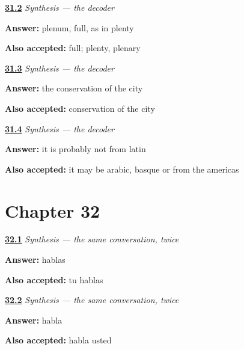 \noindent\begin{minipage}[t]{\linewidth}
\raggedright
\hyperlink{review-ES-C57-sintesis-descifrar-ll}{\textbf{31.2}} \emph{Synthesis — the decoder}\par
\small \textbf{Answer:} plenum, full, as in plenty\par
\footnotesize \textbf{Also accepted:} full; plenty, plenary
\end{minipage}\par\medskip

\noindent\begin{minipage}[t]{\linewidth}
\raggedright
\hyperlink{review-ES-C57-sintesis-descifrar-mix}{\textbf{31.3}} \emph{Synthesis — the decoder}\par
\small \textbf{Answer:} the conservation of the city\par
\footnotesize \textbf{Also accepted:} conservation of the city
\end{minipage}\par\medskip

\noindent\begin{minipage}[t]{\linewidth}
\raggedright
\hyperlink{review-ES-C57-sintesis-descifrar-limits}{\textbf{31.4}} \emph{Synthesis — the decoder}\par
\small \textbf{Answer:} it is probably not from latin\par
\footnotesize \textbf{Also accepted:} it may be arabic, basque or from the americas
\end{minipage}\par\medskip

\section*{Chapter 32}

\noindent\begin{minipage}[t]{\linewidth}
\raggedright
\hyperlink{review-ES-C06-repaso-hablar-friend}{\textbf{32.1}} \emph{Synthesis — the same conversation, twice}\par
\small \textbf{Answer:} hablas\par
\footnotesize \textbf{Also accepted:} tu hablas
\end{minipage}\par\medskip

\noindent\begin{minipage}[t]{\linewidth}
\raggedright
\hyperlink{review-ES-C06-repaso-hablar-polite}{\textbf{32.2}} \emph{Synthesis — the same conversation, twice}\par
\small \textbf{Answer:} habla\par
\footnotesize \textbf{Also accepted:} habla usted
\end{minipage}\par\medskip


